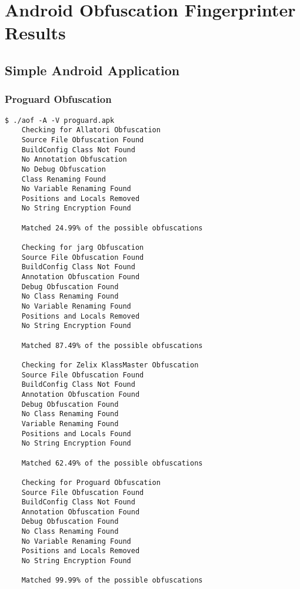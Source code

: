 \section{Android Obfuscation Fingerprinter Results}
\label{app:results}
\subsection{Simple Android Application}
\label{app:saaresults}
\subsubsection{Proguard Obfuscation}
\label{app:pguardob}
\begin{lstlisting}
$ ./aof -A -V proguard.apk
    Checking for Allatori Obfuscation
	Source File Obfuscation Found
	BuildConfig Class Not Found
	No Annotation Obfuscation
	No Debug Obfuscation
	Class Renaming Found
	No Variable Renaming Found
	Positions and Locals Removed
	No String Encryption Found

	Matched 24.99% of the possible obfuscations

    Checking for jarg Obfuscation
	Source File Obfuscation Found
	BuildConfig Class Not Found
	Annotation Obfuscation Found
	Debug Obfuscation Found
	No Class Renaming Found
	No Variable Renaming Found
	Positions and Locals Removed
	No String Encryption Found

	Matched 87.49% of the possible obfuscations

    Checking for Zelix KlassMaster Obfuscation
	Source File Obfuscation Found
	BuildConfig Class Not Found
	Annotation Obfuscation Found
	Debug Obfuscation Found
	No Class Renaming Found
	Variable Renaming Found
	Positions and Locals Found
	No String Encryption Found

	Matched 62.49% of the possible obfuscations

    Checking for Proguard Obfuscation
	Source File Obfuscation Found
	BuildConfig Class Not Found
	Annotation Obfuscation Found
	Debug Obfuscation Found
	No Class Renaming Found
	No Variable Renaming Found
	Positions and Locals Removed
	No String Encryption Found

	Matched 99.99% of the possible obfuscations
\end{lstlisting}
\newpage
